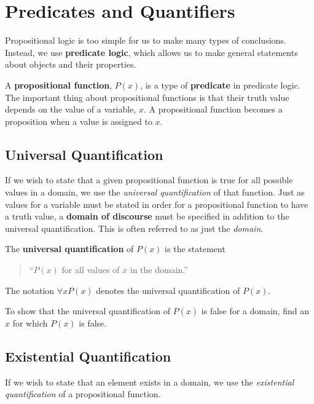 \chapter{Predicates and Quantifiers}

Propositional logic is too simple for us to make many types of conclusions.
Instead, we use \textbf{predicate logic}, which allows us to make general
statements about objects and their properties.

A \textbf{propositional function}, $P(x)$, is a
type of \textbf{predicate} in
predicate logic. The important thing about propositional functions is that their
truth value depends on the value of a variable, $x$. A propositional function
becomes a proposition when a value is assigned to $x$.

\section{Universal Quantification}

If we wish to state that a given propositional function is true for all possible
values in a domain, we use the \emph{universal quantification} of that function.
Just as values for a variable must be stated in order for a propositional
function to have a truth value, a \textbf{domain of discourse} must be specified
in addition to the universal quantification. This is often referred to as just
the \emph{domain}.

\begin{defn}
  The \textbf{universal quantification} of $P(x)$ is the statement
  \begin{quote}
    ``$P(x)$ for all values of $x$ in the domain.''
  \end{quote}
  The notation $\forall x P(x)$ denotes the universal quantification of
  $P(x)$.%
\end{defn}

To show that the universal quantification of $P(x)$ is false for a domain, find
an $x$ for which $P(x)$ is false.

\section{Existential Quantification}

If we wish to state that an element exists in a domain, we use the
\emph{existential quantification} of a propositional function.

